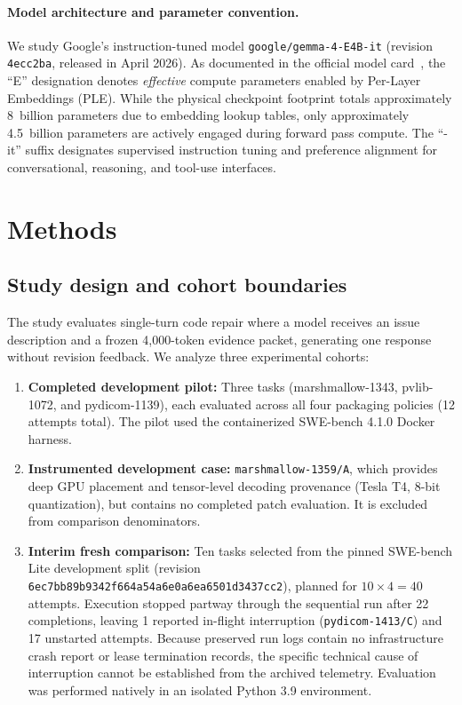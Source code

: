 \documentclass[11pt]{article}
\begin{document}
\paragraph{Model architecture and parameter convention.}
We study Google's instruction-tuned model \nolinkurl{google/gemma-4-E4B-it}
(revision \texttt{4ecc2ba}, released in April 2026).  As documented in the
official model card~\cite{gemma2026modelcard}, the ``E'' designation denotes
\emph{effective} compute parameters enabled by Per-Layer Embeddings (PLE).
While the physical checkpoint footprint totals approximately 8~billion
parameters due to embedding lookup tables, only approximately 4.5~billion
parameters are actively engaged during forward pass compute.  The
``-it'' suffix designates supervised instruction tuning and preference
alignment for conversational, reasoning, and tool-use interfaces.

\section{Methods}

\subsection{Study design and cohort boundaries}

The study evaluates single-turn code repair where a model receives an
issue description and a frozen 4{,}000-token evidence packet, generating
one response without revision feedback.  We analyze three experimental
cohorts:

\begin{enumerate}[nosep]
  \item \textbf{Completed development pilot:} Three tasks
    (marshmallow-1343, pvlib-1072, and pydicom-1139),
    each evaluated across all four packaging policies (12 attempts total).
    The pilot used the containerized SWE-bench 4.1.0 Docker harness.
  \item \textbf{Instrumented development case:} \texttt{marshmallow-1359/A},
    which provides deep GPU placement and tensor-level decoding provenance
    (Tesla T4, 8-bit quantization), but contains no completed patch
    evaluation.  It is excluded from comparison denominators.
  \item \textbf{Interim fresh comparison:} Ten tasks selected from the
    pinned SWE-bench Lite development split
    (revision \texttt{6ec7bb8}\allowbreak\texttt{9b9342f6}\allowbreak\texttt{64a54a6e}\allowbreak\texttt{0a6ea650}\allowbreak\texttt{1d3437cc2}),
    planned for $10 \times 4 = 40$ attempts.  Execution stopped partway
    through the sequential run after 22 completions, leaving 1 reported
    in-flight interruption (\texttt{pydicom-1413/C}) and 17 unstarted
    attempts.  Because preserved run logs contain no infrastructure crash
    report or lease termination records, the specific technical cause of
    interruption cannot be established from the archived telemetry.
    Evaluation was performed natively in an isolated Python 3.9 environment.
\end{enumerate}
\end{document}
